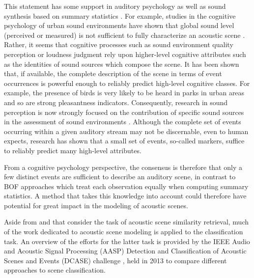 \documentclass[journal]{IEEEtran}
\begin{document}
This statement has some support in auditory psychology as well as sound synthesis based on summary statistics \cite{mcdermott2013summary}. For example, studies in the cognitive psychology of urban sound environments have shown that global sound level (perceived or measured) is not sufficient to fully characterize an acoustic scene \cite{guyot2005urban,kang2006urban}. Rather, it seems that cognitive processes such as sound environment quality perception \cite{dubois2006cognitive} or loudness judgment \cite{kuwano_memory_2003} rely upon higher-level cognitive attributes such as the identities of sound sources which compose the scene. It has been shown that, if available, the complete description of the scene in terms of event occurrences is powerful enough to reliably predict high-level cognitive classes. For example, the presence of birds is very likely to be heard in parks in urban areas and so are strong pleasantness indicators. Consequently, research in sound perception is now strongly focused on the contribution of specific sound sources in the assessment of sound environments \cite{ricciardi2015sound,lavandier2006contribution}. Although the complete set of events occurring within a given auditory stream may not be discernable, even to human expects, research has shown that a small set of events, so-called markers, suffice to reliably predict many high-level attributes.

From a cognitive psychology perspective, the consensus is therefore that only a few distinct events are sufficient to describe an auditory scene, in contrast to BOF approaches which treat each observation equally when computing summary statistics. A method that takes this knowledge into account could therefore have potential for great impact in the modeling of acoustic scenes.

Aside from \cite{aucouturier2007bag} and \cite{lagrange:hal-01082501} that consider the task of acoustic scene similarity retrieval, much of the work dedicated to acoustic scene modeling is applied to the classification task.
An overview of the efforts for the latter task is provided by the IEEE Audio and Acoustic Signal Processing (AASP) Detection and Classification of Acoustic Scenes and Events (DCASE) challenge \cite{barchiesi2015acoustic}, held in 2013 to compare different approaches to scene classification.
\end{document}
